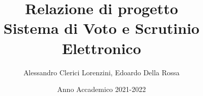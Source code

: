 \documentclass{report}
\begin{document}
\title{Relazione di progetto\\
\large Sistema di Voto e Scrutinio Elettronico}
\author{Alessandro Clerici Lorenzini, Edoardo Della Rossa}
\date{Anno Accademico 2021-2022}

\maketitle
\tableofcontents









\appendix


\end{document}
